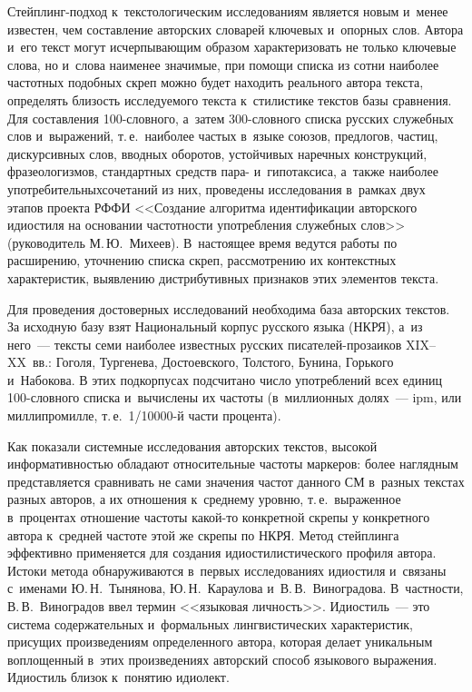\begin{multicols}{2}
Стейплинг-под\-ход к~текстологическим 
исследованиям является новым и~менее из\-вес\-тен, 
чем составление авторских словарей ключевых и~опорных слов. Автора и~его 
текст могут исчерпывающим образом характеризовать не только ключевые 
слова, но и~слова наименее значимые, при помощи списка из сотни наиболее 
частотных подобных скреп можно будет находить реального автора текста, 
определять близость исследуемого текста к~стилистике текстов базы 
сравнения. Для составления 100-слов\-но\-го, а~затем 300-слов\-но\-го 
списка русских служебных слов и~выражений, т.\,е.\ наиболее частых в~языке 
союзов, предлогов, час\-тиц, дискурсивных слов, вводных оборотов, 
устойчивых наречных конструкций, фразеологизмов, стандартных средств 
пара- и~гипотаксиса, а~также наиболее употребительных\linebreak сочетаний из них, 
проведены исследования в~рамках двух этапов проекта РФФИ <<Создание 
алгоритма идентификации авторского идиостиля на основании час\-тот\-ности 
употребления служебных слов>> (руководитель М.\,Ю.~Михеев). 
В~настоящее время ведутся работы по расширению, уточнению списка 
скреп, рас\-смот\-ре\-нию их контекстных характеристик, выявлению 
дистрибутивных признаков этих элементов текста.
     
     Для проведения достоверных исследований необходима база авторских 
текстов. За исходную базу взят Национальный корпус русского языка
(НКРЯ), а~из 
него~--- тексты семи наиболее известных русских  
пи\-са\-те\-лей-про\-заи\-ков XIX--XX~вв.: Гоголя, Тургенева, 
Достоевского, Толстого, Бунина, Горького и~Набокова. В этих подкорпусах 
подсчитано чис\-ло употреблений всех единиц 100-слов\-но\-го списка 
и~вычислены их частоты (в~миллионных долях~--- ipm, или миллипромилле, 
т.\,е.\ 1/10000-й части процента). 
     
     Как показали системные исследования авторских текстов, высокой 
информативностью обладают относительные частоты маркеров: более 
наглядным представляется сравнивать не сами значения частот данного 
СМ в~разных текстах разных авторов, а их отношения 
к~среднему уровню, т.\,е.\ выраженное в~процентах отношение частоты  
ка\-кой-то конкретной скрепы у конкретного автора к~средней частоте этой 
же скрепы по НКРЯ. Метод стейплинга эффективно применяется для 
создания идиостилистического профиля автора. Истоки метода 
обнаруживаются в~первых исследованиях идиостиля и~связаны с~именами 
Ю.\,Н.~Тынянова, Ю.\,Н.~Караулова и~В.\,В.~Виноградова. В~част\-ности, 
В.\,В.~Виноградов ввел термин <<языковая личность>>. Идиостиль~--- это 
система содержательных и~формальных лингвистических характеристик, 
присущих произведениям определенного автора, которая делает уникальным 
воплощенный в~этих произведениях авторский способ языкового выражения. 
Идиостиль близок к~понятию идио\-лект. 
{

}
\end{multicols}
